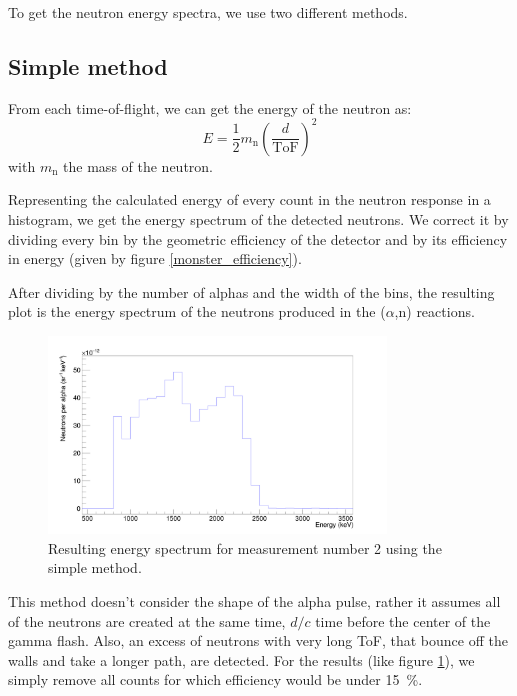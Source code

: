 \documentclass[a4paper,12pt]{report}
\newcommand{\an}{($\alpha$,n) }
\begin{document}
To get the neutron energy spectra, we use two different methods.

\subsection{Simple method}
From each time-of-flight, we can get the energy of the neutron as:
\begin{equation}
	E=\frac{1}{2} m_\text{n} \left( \frac{d}{\text{ToF}} \right)^2
\end{equation}
with $m_\text{n}$ the mass of the neutron.

Representing the calculated energy of every count in the neutron response in a histogram, we get the energy spectrum of the detected neutrons.
We correct it by dividing every bin by the geometric efficiency of the detector and by its efficiency in energy (given by figure \ref{monster_efficiency}).

After dividing by the number of alphas and the width of the bins, the resulting plot is the energy spectrum of the neutrons produced in the \an reactions.
\\

\begin{figure}[H]
	\centering
	\includegraphics[width=0.80\textwidth]{pulsed_energysimple.png}
	\caption{Resulting energy spectrum for measurement number 2 using the simple method.}
	\label{pulsed_energysimple}
\end{figure}

This method doesn't consider the shape of the alpha pulse, rather it assumes all of the neutrons are created at the same time, $d/c$ time before the center of the gamma flash.
Also, an excess of neutrons with very long ToF, that bounce off the walls and take a longer path, are detected.
For the results (like figure \ref{pulsed_energysimple}), we simply remove all counts for which efficiency would be under \qty{15}{\percent}.
\end{document}
